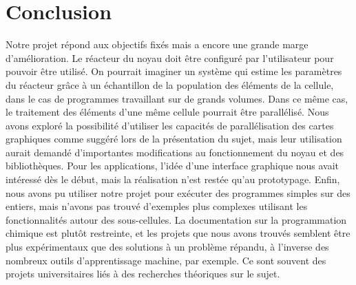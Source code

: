 \documentclass[a4paper, 12pt]{article}
\begin{document}
\section{Conclusion}
Notre projet répond aux objectifs fixés mais a encore une grande marge d’amélioration. Le réacteur du noyau doit être configuré par l’utilisateur pour pouvoir être utilisé. On pourrait imaginer un système qui estime les paramètres du réacteur grâce à un échantillon de la population des éléments de la cellule, dans le cas de programmes travaillant sur de grands volumes. Dans ce même cas, le traitement des éléments d’une même cellule pourrait être parallélisé. Nous avons exploré la possibilité d’utiliser les capacités de parallélisation des cartes graphiques comme suggéré lors de la présentation du sujet, mais leur utilisation aurait demandé d’importantes modifications au fonctionnement du noyau et des bibliothèques. Pour les applications, l’idée d’une interface graphique nous avait intéressé dès le début, mais la réalisation n’est restée qu’au prototypage. Enfin, nous avons pu utiliser notre projet pour exécuter des programmes simples sur des entiers, mais n’avons pas trouvé d’exemples plus complexes utilisant les fonctionnalités autour des sous-cellules.
La documentation sur la programmation chimique est plutôt restreinte, et les projets que nous avons trouvés semblent être plus expérimentaux que des solutions à un problème répandu, à l’inverse des nombreux outils d’apprentissage machine, par exemple. Ce sont souvent des projets universitaires liés à des recherches théoriques sur le sujet.
\end{document}
